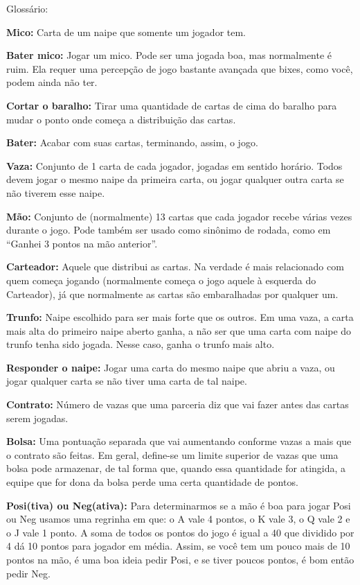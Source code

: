 \begin{subsecao}{Glossário:}

\textbf{Mico:} Carta de um naipe que somente um jogador tem.

\textbf{Bater mico:} Jogar um mico. Pode ser uma jogada boa, mas normalmente é
ruim. Ela requer uma percepção de jogo bastante avançada que bixes,
como você, podem ainda não ter.

\textbf{Cortar o baralho:} Tirar uma quantidade de cartas de cima do baralho
para mudar o ponto onde começa a distribuição das cartas.

\textbf{Bater:} Acabar com suas cartas, terminando, assim, o jogo.

\textbf{Vaza:} Conjunto de 1 carta de cada jogador, jogadas em sentido horário.
Todos devem jogar o mesmo naipe da primeira carta, ou jogar qualquer outra
carta se não tiverem esse naipe.

\textbf{Mão:} Conjunto de (normalmente) 13 cartas que cada jogador recebe
várias vezes durante o jogo. Pode também ser usado como sinônimo de rodada,
como em ``Ganhei 3 pontos na mão anterior''.

\textbf{Carteador:} Aquele que distribui as cartas. Na verdade é mais
relacionado com quem começa jogando (normalmente começa o jogo aquele à
esquerda do Carteador), já que normalmente as cartas são embaralhadas por
qualquer um.

\textbf{Trunfo:} Naipe escolhido para ser mais forte que os outros. Em uma
vaza, a carta mais alta do primeiro naipe aberto ganha, a não ser que uma
carta com naipe do trunfo tenha sido jogada. Nesse caso, ganha o trunfo mais
alto.

\textbf{Responder o naipe:} Jogar uma carta do mesmo naipe que abriu a vaza,
ou jogar qualquer carta se não tiver uma carta de tal naipe.

\textbf{Contrato:} Número de vazas que uma parceria diz que vai fazer antes
das cartas serem jogadas.

\textbf{Bolsa:} Uma pontuação separada que vai aumentando conforme vazas a
mais que o contrato são feitas. Em geral, define-se um limite superior de vazas
que uma bolsa pode armazenar, de tal forma que, quando essa quantidade for
atingida, a equipe que for dona da bolsa perde uma certa quantidade de pontos.

\textbf{Posi(tiva) ou Neg(ativa):} Para determinarmos se a mão é boa para jogar
Posi ou Neg usamos uma regrinha em que: o A vale 4 pontos, o K vale 3, o Q vale
2 e o J vale 1 ponto. A soma de todos os pontos do jogo é igual a 40 que dividido
por 4 dá 10 pontos para jogador em média. Assim, se você tem um pouco mais de 10
pontos na mão, é uma boa ideia pedir Posi, e se tiver poucos pontos, é bom
então pedir Neg.


\end{subsecao}
